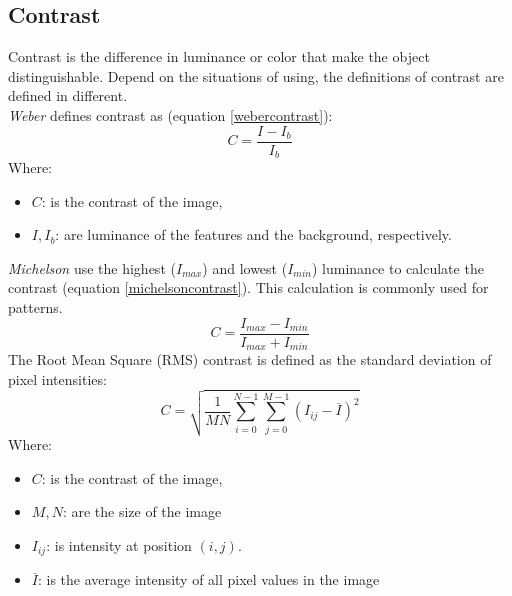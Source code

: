 \documentclass[12pt,a4paper]{article}
\begin{document}
\subsection{Contrast}
Contrast is the difference in luminance or color that make the object distinguishable. Depend on the situations of using, the definitions of contrast are defined in different.\\
\textit{Weber} \cite{fechner1948elements} defines contrast as (equation \ref{webercontrast}):
\begin{equation}
	C = \frac{I - I_b}{I_b}
	\label{webercontrast}
\end{equation}
Where:
\begin{itemize}
	\item  $C$: is the contrast of the image,
	\item  $I, I_b$: are luminance of the features and the background, respectively.
\end{itemize}
\textit{Michelson} \cite{michelson1995studies} use the highest ($I_{max}$) and lowest ($I_{min}$) luminance to calculate the contrast (equation \ref{michelsoncontrast}). This calculation is commonly used for patterns.
\begin{equation}
	C = \frac{I_{max} - I_{min}}{I_{max} + I_{min}}
	\label{michelsoncontrast}
\end{equation}
The Root Mean Square (RMS) \cite{peli1990contrast} contrast is defined as the standard deviation of pixel intensities: 
\begin{equation}
	C = \sqrt{\frac{1}{MN}\sum_{i=0}^{N-1}\sum_{j=0}^{M-1}(I_{ij} - \overline{I})^2}
\end{equation}
Where:
\begin{itemize}
	\item  $C$: is the contrast of the image,
	\item $M,N$: are the size of the image
	\item $I_{ij}$: is intensity at position $(i,j)$.
	\item $\overline{I}$: is the average intensity of all pixel values in the image
\end{itemize}
\end{document}

